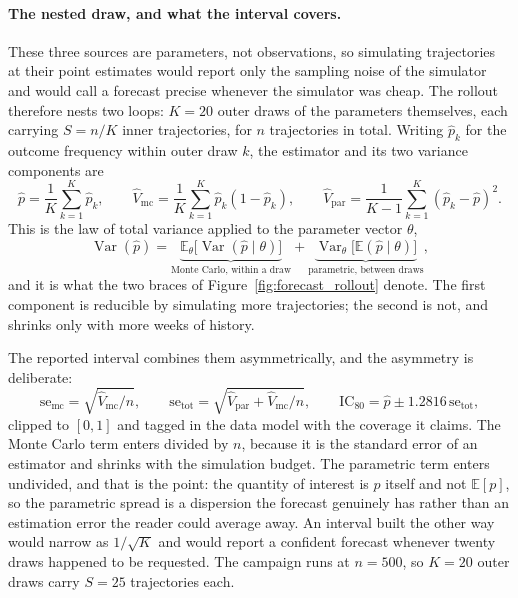 \paragraph{The nested draw, and what the interval covers.}
These three sources are parameters, not observations, so simulating trajectories at their
point estimates would report only the sampling noise of the simulator and would call a
forecast precise whenever the simulator was cheap. The rollout therefore nests two loops:
$K = 20$ outer draws of the parameters themselves, each carrying $S = n/K$ inner
trajectories, for $n$ trajectories in total. Writing $\hat{p}_k$ for the outcome frequency
within outer draw $k$, the estimator and its two variance components are
\begin{equation}
    \hat{p} = \frac{1}{K}\sum_{k=1}^{K} \hat{p}_k,
    \qquad
    \widehat{V}_{\mathrm{mc}} = \frac{1}{K}\sum_{k=1}^{K} \hat{p}_k(1-\hat{p}_k),
    \qquad
    \widehat{V}_{\mathrm{par}} = \frac{1}{K-1}\sum_{k=1}^{K} (\hat{p}_k - \hat{p})^2 .
    \label{eq:variance_components}
\end{equation}
This is the law of total variance applied to the parameter vector $\theta$,
\begin{equation}
    \operatorname{Var}(\hat{p})
    = \underbrace{\mathbb{E}_{\theta}\bigl[\operatorname{Var}(\hat{p} \mid \theta)\bigr]}
      _{\text{Monte Carlo, within a draw}}
    + \underbrace{\operatorname{Var}_{\theta}\bigl[\mathbb{E}(\hat{p} \mid \theta)\bigr]}
      _{\text{parametric, between draws}} ,
    \label{eq:total_variance}
\end{equation}
and it is what the two braces of Figure~\ref{fig:forecast_rollout} denote. The first
component is reducible by simulating more trajectories; the second is not, and shrinks only
with more weeks of history.

The reported interval combines them asymmetrically, and the asymmetry is deliberate:
\begin{equation}
    \mathrm{se}_{\mathrm{mc}} = \sqrt{\widehat{V}_{\mathrm{mc}} / n},
    \qquad
    \mathrm{se}_{\mathrm{tot}} = \sqrt{\widehat{V}_{\mathrm{par}}
                                       + \widehat{V}_{\mathrm{mc}} / n},
    \qquad
    \mathrm{IC}_{80} = \hat{p} \pm 1.2816\,\mathrm{se}_{\mathrm{tot}},
    \label{eq:ic80}
\end{equation}
clipped to $[0,1]$ and tagged in the data model with the coverage it claims. The Monte Carlo
term enters divided by $n$, because it is the standard error of an estimator and shrinks with
the simulation budget. The parametric term enters undivided, and that is the point: the
quantity of interest is $p$ itself and not $\mathbb{E}[p]$, so the parametric spread is a
dispersion the forecast genuinely has rather than an estimation error the reader could
average away. An interval built the other way would narrow as $1/\sqrt{K}$ and would report
a confident forecast whenever twenty draws happened to be requested. The campaign runs at
$n = 500$, so $K = 20$ outer draws carry $S = 25$ trajectories each.

